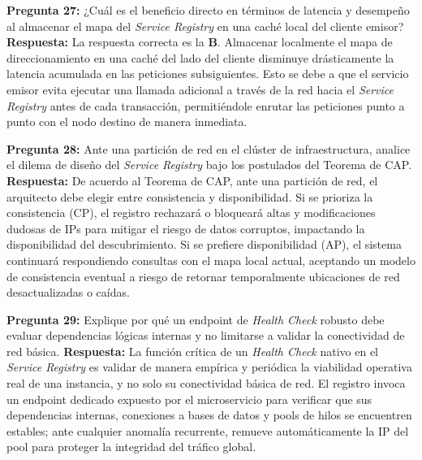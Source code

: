 \vspace{4mm}

\noindent\textbf{Pregunta 27:} ¿Cuál es el beneficio directo en términos de latencia y desempeño al almacenar el mapa del \textit{Service Registry} en una caché local del cliente emisor?
\newline
\textbf{Respuesta:} La respuesta correcta es la \textbf{B}. Almacenar localmente el mapa de direccionamiento en una caché del lado del cliente disminuye drásticamente la latencia acumulada en las peticiones subsiguientes. Esto se debe a que el servicio emisor evita ejecutar una llamada adicional a través de la red hacia el \textit{Service Registry} antes de cada transacción, permitiéndole enrutar las peticiones punto a punto con el nodo destino de manera inmediata.

\vspace{4mm}

\noindent\textbf{Pregunta 28:} Ante una partición de red en el clúster de infraestructura, analice el dilema de diseño del \textit{Service Registry} bajo los postulados del Teorema de CAP.
\newline
\textbf{Respuesta:} De acuerdo al Teorema de CAP, ante una partición de red, el arquitecto debe elegir entre consistencia y disponibilidad. Si se prioriza la consistencia (CP), el registro rechazará o bloqueará altas y modificaciones dudosas de IPs para mitigar el riesgo de datos corruptos, impactando la disponibilidad del descubrimiento. Si se prefiere disponibilidad (AP), el sistema continuará respondiendo consultas con el mapa local actual, aceptando un modelo de consistencia eventual a riesgo de retornar temporalmente ubicaciones de red desactualizadas o caídas.

\vspace{4mm}

\noindent\textbf{Pregunta 29:} Explique por qué un endpoint de \textit{Health Check} robusto debe evaluar dependencias lógicas internas y no limitarse a validar la conectividad de red básica.
\newline
\textbf{Respuesta:} La función crítica de un \textit{Health Check} nativo en el \textit{Service Registry} es validar de manera empírica y periódica la viabilidad operativa real de una instancia, y no solo su conectividad básica de red. El registro invoca un endpoint dedicado expuesto por el microservicio para verificar que sus dependencias internas, conexiones a bases de datos y pools de hilos se encuentren estables; ante cualquier anomalía recurrente, remueve automáticamente la IP del pool para proteger la integridad del tráfico global.

